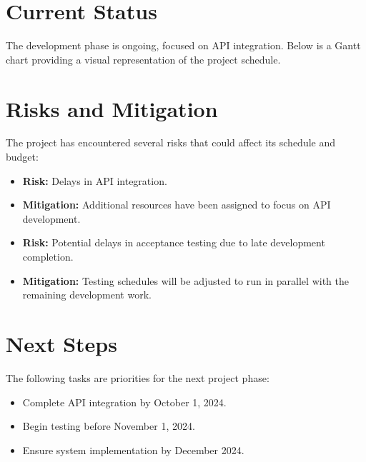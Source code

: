 \documentclass[12pt]{article}
\begin{document}
\section{Current Status}
The development phase is ongoing, focused on API integration. Below is a Gantt chart providing a visual representation of the project schedule.

\begin{center}
\end{center}

\section{Risks and Mitigation}
The project has encountered several risks that could affect its schedule and budget:
\begin{itemize}
    \item \textbf{Risk:} Delays in API integration.
    \item \textbf{Mitigation:} Additional resources have been assigned to focus on API development.
    \item \textbf{Risk:} Potential delays in acceptance testing due to late development completion.
    \item \textbf{Mitigation:} Testing schedules will be adjusted to run in parallel with the remaining development work.
\end{itemize}

\section{Next Steps}
The following tasks are priorities for the next project phase:
\begin{itemize}
    \item Complete API integration by October 1, 2024.
    \item Begin testing before November 1, 2024.
    \item Ensure system implementation by December 2024.
\end{itemize}
\end{document}
